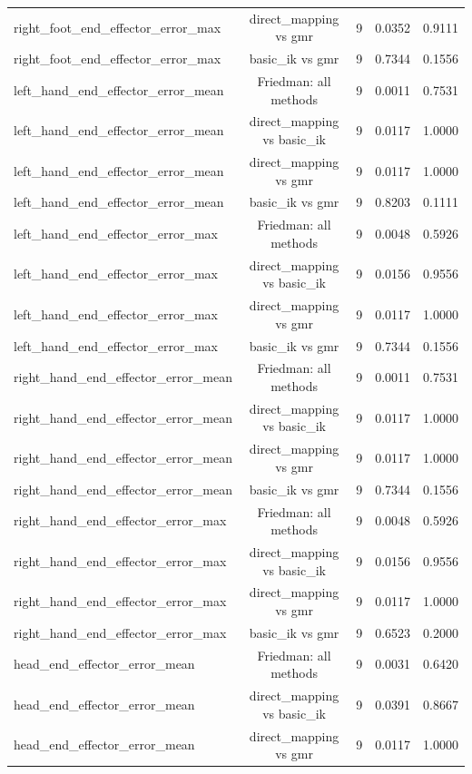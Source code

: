 \begin{table}[t]
{\begin{tabular}{lcccc}
right\_foot\_end\_effector\_error\_max & direct\_mapping vs gmr & 9 & 0.0352 & 0.9111 \\
right\_foot\_end\_effector\_error\_max & basic\_ik vs gmr & 9 & 0.7344 & 0.1556 \\
left\_hand\_end\_effector\_error\_mean & Friedman: all methods & 9 & 0.0011 & 0.7531 \\
left\_hand\_end\_effector\_error\_mean & direct\_mapping vs basic\_ik & 9 & 0.0117 & 1.0000 \\
left\_hand\_end\_effector\_error\_mean & direct\_mapping vs gmr & 9 & 0.0117 & 1.0000 \\
left\_hand\_end\_effector\_error\_mean & basic\_ik vs gmr & 9 & 0.8203 & 0.1111 \\
left\_hand\_end\_effector\_error\_max & Friedman: all methods & 9 & 0.0048 & 0.5926 \\
left\_hand\_end\_effector\_error\_max & direct\_mapping vs basic\_ik & 9 & 0.0156 & 0.9556 \\
left\_hand\_end\_effector\_error\_max & direct\_mapping vs gmr & 9 & 0.0117 & 1.0000 \\
left\_hand\_end\_effector\_error\_max & basic\_ik vs gmr & 9 & 0.7344 & 0.1556 \\
right\_hand\_end\_effector\_error\_mean & Friedman: all methods & 9 & 0.0011 & 0.7531 \\
right\_hand\_end\_effector\_error\_mean & direct\_mapping vs basic\_ik & 9 & 0.0117 & 1.0000 \\
right\_hand\_end\_effector\_error\_mean & direct\_mapping vs gmr & 9 & 0.0117 & 1.0000 \\
right\_hand\_end\_effector\_error\_mean & basic\_ik vs gmr & 9 & 0.7344 & 0.1556 \\
right\_hand\_end\_effector\_error\_max & Friedman: all methods & 9 & 0.0048 & 0.5926 \\
right\_hand\_end\_effector\_error\_max & direct\_mapping vs basic\_ik & 9 & 0.0156 & 0.9556 \\
right\_hand\_end\_effector\_error\_max & direct\_mapping vs gmr & 9 & 0.0117 & 1.0000 \\
right\_hand\_end\_effector\_error\_max & basic\_ik vs gmr & 9 & 0.6523 & 0.2000 \\
head\_end\_effector\_error\_mean & Friedman: all methods & 9 & 0.0031 & 0.6420 \\
head\_end\_effector\_error\_mean & direct\_mapping vs basic\_ik & 9 & 0.0391 & 0.8667 \\
head\_end\_effector\_error\_mean & direct\_mapping vs gmr & 9 & 0.0117 & 1.0000 \\

\end{tabular}}
\end{table}
